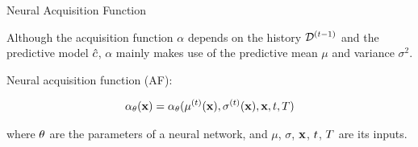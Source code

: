 \begin{frame}[c]{Neural Acquisition Function  }

Although the \alert{acquisition function $\alpha$} depends on the history $\mathcal{D}^{(t-1)}$ and the predictive model $\hat{c}$, $\alpha$ mainly makes use of the \alert{predictive mean $\mu$ and variance $\sigma^2$}.

\pause
\bigskip

Neural acquisition function (AF):

\begin{eqnarray}
\alpha_\theta(\mathbf{x}) = \alpha_\theta(\mu^{(t)}(\mathbf{x}), \sigma^{(t)}(\mathbf{x}), \mathbf{x}, t, T) \nonumber
\end{eqnarray}

where $\theta$ are the parameters of a neural network, and $\mu$, $\sigma$, $\mathbf{x}$, $t$, $T$ are its inputs.


\end{frame}
